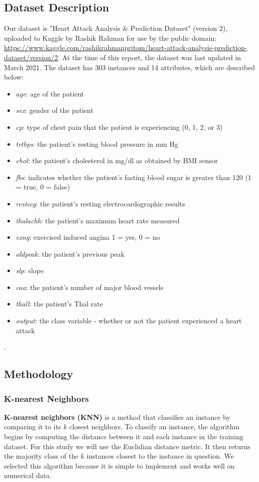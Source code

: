\documentclass{article}
\begin{document}
\subsection{Dataset Description}
Our dataset is "Heart Attack Analysis \& Prediction Dataset" (version 2), uploaded to Kaggle by Rashik Rahman for use by the public domain: \url{https://www.kaggle.com/rashikrahmanpritom/heart-attack-analysis-prediction-dataset/version/2}. At the time of this report, the dataset was last updated in March 2021. The dataset has 303 instances and 14 attributes, which are described below:
\begin{itemize}
\item \textit{age}: age of the patient
\item \textit{sex}: gender of the patient
\item \textit{cp}: type of chest pain that the patient is experiencing (0, 1, 2, or 3)
\item \textit{trtbps}: the patient's resting blood pressure in mm Hg
\item \textit{chol}: the patient's cholesterol in mg/dl as obtained by BMI sensor
\item \textit{fbs}: indicates whether the patient's fasting blood sugar is greater than 120 (1 = true, 0 = false)
\item \textit{restecg}: the patient's resting electrocardographic results
\item \textit{thalachh}: the patient's maximum heart rate measured
\item \textit{exng}: exercised induced angina {1 = yes, 0 = no}
\item \textit{oldpeak}: the patient's previous peak
\item \textit{slp}: slope
\item \textit{caa}: the patient's number of major blood vessels
\item \textit{thall}: the patient's Thal rate
\item \textit{output}: the class variable - whether or not the patient experienced a heart attack
\end{itemize}
.
\subsection{Methodology}
\subsubsection{K-nearest Neighbors}
\textbf{K-nearest neighbors (KNN)} is a method that classifies an instance by comparing it to its $k$ closest neighbors. To classify an instance, the algorithm begins by computing the distance between it and each instance in the training dataset. For this study we will use the Euclidian distance metric. It then returns the majority class of the $k$ instances closest to the instance in question. We selected this algorithm because it is simple to implement and works well on numerical data.
\end{document}
